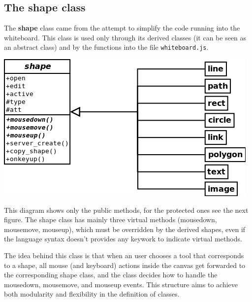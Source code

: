 \documentclass[10pt,a4paper,english]{book}
\begin{document}

\hypertarget{the-shape-class}{}
\subsection{The shape class}
\label{the-shape-class}

The \textbf{shape} class came from the attempt to simplify the code running
into the whiteboard. This class is used only through its derived
classes (it can be seen as an abstract class) and by the functions
into the file \texttt{whiteboard.js}.

\includegraphics{images/Shape_derivation_diagram.png}

This diagram shows only the public methods, for the protected ones see
the next figure. The shape class has mainly three virtual methods
(mousedown, mousemove, mouseup), which must be overridden by the
derived shapes, even if the language syntax doesn't provides any
keywork to indicate virtual methods.

The idea behind this class is that when an user chooses a tool that
corresponds to a shape, all mouse (and keyboard) actions inside the
canvas get forwarded to the corresponding shape class, and the class
decides how to handle the mousedown, mousemove, and mouseup
events. This structure aims to achieve both modularity and flexibility
in the definition of classes.
\end{document}
